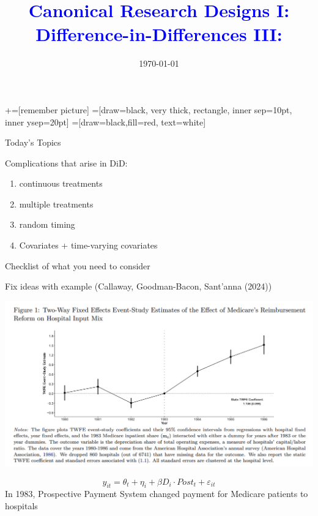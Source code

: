 \documentclass[notes,11pt, aspectratio=169]{beamer}
\title[]{\textcolor{blue}{Canonical Research Designs I:\\ Difference-in-Differences III:\\
  }}
\author[PGP]{}
\institute[FRBNY]{\small{\begin{tabular}{c}
  Paul Goldsmith-Pinkham  \\
\end{tabular}}}
\date{\today}
\newenvironment{wideitemize}{\itemize\addtolength{\itemsep}{10pt}}{\enditemize}
\begin{document}
\newcommand\marktopleft[1]{%
    \tikz[overlay,remember picture] 
        \node (marker-#1-a) at (-.3em,.3em) {};%
}
\newcommand\markbottomright[2]{%
    \tikz[overlay,remember picture] 
        \node (marker-#1-b) at (0em,0em) {};%
}
+=[remember picture] 
 =[draw=black, very thick, rectangle, inner sep=10pt, inner ysep=20pt]
 =[draw=black,fill=red, text=white]

\begin{frame}
\maketitle
\end{frame}

\begin{frame}{Today's Topics}
  \begin{wideitemize}
  \item Complications that arise in DiD:
    \begin{enumerate}
    \item continuous treatments
    \item multiple treatments
    \item random timing
    \item Covariates + time-varying covariates
    \end{enumerate}
  \item Checklist of what you need to consider
  \end{wideitemize}
\end{frame}

\begin{frame}{Fix ideas with example (Callaway, Goodman-Bacon, Sant'anna (2024))}
  \begin{center}
    \includegraphics[width=0.75\linewidth]{images/continuous_did.png}
  \end{center}
  \begin{equation*}
    y_{it} = \theta_{t} + \eta_{i} + \beta D_{i} \cdot Post_{t} + \varepsilon_{it}
  \end{equation*}
  In 1983, Prospective Payment System changed payment for Medicare patients to hospitals
\end{frame}
\end{document}
